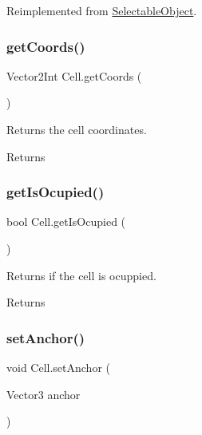Reimplemented from \mbox{\hyperlink{class_selectable_object_a12caa058f4c53aa5debb1004f1169202}{Selectable\+Object}}.

\mbox{\label{class_cell_ac964517dec897f8cbef491e6942603dd}} 
\subsubsection{\texorpdfstring{get\+Coords()}{getCoords()}}
{\footnotesize\ttfamily Vector2\+Int Cell.\+get\+Coords (\begin{DoxyParamCaption}{ }\end{DoxyParamCaption})}



Returns the cell coordinates. 

\begin{DoxyReturn}{Returns}

\end{DoxyReturn}
\mbox{\label{class_cell_af88aea83835a3e1c6bbf339a945fc994}} 
\subsubsection{\texorpdfstring{get\+Is\+Ocupied()}{getIsOcupied()}}
{\footnotesize\ttfamily bool Cell.\+get\+Is\+Ocupied (\begin{DoxyParamCaption}{ }\end{DoxyParamCaption})}



Returns if the cell is ocuppied. 

\begin{DoxyReturn}{Returns}

\end{DoxyReturn}
\mbox{\label{class_cell_af6990e51b59b0b2b3ad5a20437c3d527}} 
\subsubsection{\texorpdfstring{set\+Anchor()}{setAnchor()}}
{\footnotesize\ttfamily void Cell.\+set\+Anchor (\begin{DoxyParamCaption}\item[{Vector3}]{anchor }\end{DoxyParamCaption})}



